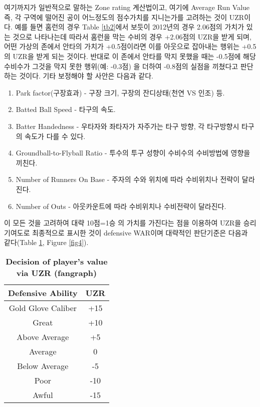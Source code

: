 \documentclass[11pt]{article}
\begin{document}
여기까지가 일반적으로 말하는 Zone rating 계산법이고, 여기에 Average Run Value 즉, 각 구역에 떨어진 공이 어느정도의 점수가치를 지니는가를 고려하는 것이 UZR이다. 예를 들면 홈런의 경우 Table \ref{tb2}에서 보듯이 2012년의 경우 2.06점의 가치가 있는 것으로 나타나는데 따라서 홈런을 막는 수비의 경우 +2.06점의 UZR을 받게 되며, 어떤 가상의 존에서 안타의 가치가 +0.5점이라면 이를 아웃으로 잡아내는 행위는 +0.5의 UZR을 받게 되는 것이다. 반대로 이 존에서 안타를 막지 못했을 때는 -0.5점에 해당 수비수가 그것을 막지 못한 행위(예: -0.3점) 을 더하여 -0.8점의 실점을 끼쳤다고 판단하는 것이다. 기타 보정해야 할 사안은 다음과 같다.

\begin{enumerate}
  \item Park factor(구장효과) - 구장 크기, 구장의 잔디상태(천연 VS 인조) 등.
  \item Batted Ball Speed - 타구의 속도.
  \item Batter Handedness - 우타자와 좌타자가 자주가는 타구 방향, 각 타구방향시 타구의 속도가 다를 수 있다.
  \item Groundball-to-Flyball Ratio - 투수의 투구 성향이 수비수의 수비방법에 영향을 끼친다.
  \item Number of Runners On Base - 주자의 수와 위치에 따라 수비위치나 전략이 달라진다.
  \item Number of Outs - 아웃카운트에 따라 수비위치나 수비전략이 달라진다. 
\end{enumerate}

이 모든 것을 고려하여 대략 10점=1승 의 가치를 가진다는 점을 이용하여 UZR을 승리기여도로 최종적으로 표시한 것이 defensive WAR이며 대략적인 판단기준은 다음과 같다\cite{UZRfig}(Table \ref{tb5}, Figure \ref{fig4}).

\begin{table}
\centering
\begin{tabular}{|c|c|}
\hline
Defensive Ability& UZR   \\ \hline
Gold Glove Caliber&	+15\\
Great&	+10\\
Above Average&	+5\\
Average&	 0\\
Below Average&	-5\\
Poor&	-10 \\
Awful&	-15 \\ \hline
\end{tabular}\\
\caption{\bf{Decision of player's value via UZR (fangraph)}}
\label{tb5}
\end{table}
\end{document}
